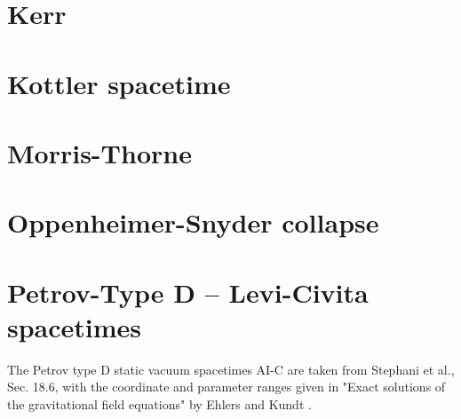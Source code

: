 \documentclass[10pt,twoside,notitlepage,a4paper,fleqn,openbib]{report}
\begin{document}
\clearpage
\section{Kerr}
\setcounter{equation}{0}

\clearpage
\section{Kottler spacetime}
\setcounter{equation}{0}

\clearpage
\section{Morris-Thorne}
\setcounter{equation}{0}

\clearpage
\section{Oppenheimer-Snyder collapse}
\setcounter{equation}{0}

\clearpage
\section{Petrov-Type D -- Levi-Civita spacetimes}
\setcounter{equation}{0}
The Petrov type D static vacuum spacetimes AI-C are taken from Stephani et al.\cite{exact2003}, Sec. 18.6, with the coordinate and parameter ranges given in "Exact solutions of the gravitational field equations" by Ehlers and Kundt \cite{ehlers1962}.
% 
% 
% 
% 
% 
% 
% 
\end{document}
